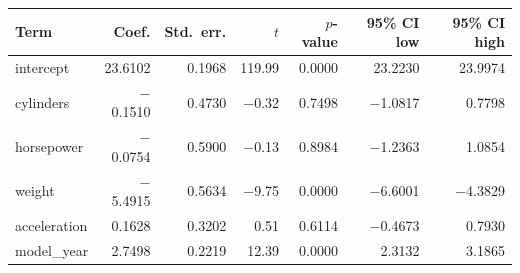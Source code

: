 \begin{tabular}{@{}lrrrrrr@{}}
\toprule
Term & Coef. & Std.\ err. & $t$ & $p$-value & 95\% CI low & 95\% CI high \\
\midrule
intercept & 23.6102 & 0.1968 & 119.99 & 0.0000 & 23.2230 & 23.9974 \\
cylinders & $-$0.1510 & 0.4730 & $-$0.32 & 0.7498 & $-$1.0817 & 0.7798 \\
horsepower & $-$0.0754 & 0.5900 & $-$0.13 & 0.8984 & $-$1.2363 & 1.0854 \\
weight & $-$5.4915 & 0.5634 & $-$9.75 & 0.0000 & $-$6.6001 & $-$4.3829 \\
acceleration & 0.1628 & 0.3202 & 0.51 & 0.6114 & $-$0.4673 & 0.7930 \\
model\_year & 2.7498 & 0.2219 & 12.39 & 0.0000 & 2.3132 & 3.1865 \\
\bottomrule
\end{tabular}